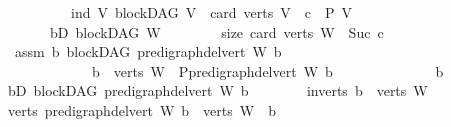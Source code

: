 \begin{isabellebody}
\ \ \isamarkupfalse%
\ {\isacharminus}{\kern0pt}\isanewline
\ \ \ \ \isamarkupfalse%
\ ind{\isacharcolon}{\kern0pt}\ {\isachardoublequoteopen}{\isasymAnd}V{\isachardot}{\kern0pt}\ {\isacharparenleft}{\kern0pt}blockDAG\ V\ {\isasymLongrightarrow}\ card\ {\isacharparenleft}{\kern0pt}verts\ V{\isacharparenright}{\kern0pt}\ {\isacharequal}{\kern0pt}\ c\ {\isasymLongrightarrow}\ P\ V{\isacharparenright}{\kern0pt}{\isachardoublequoteclose}\isanewline
\ \ \ \ \ \ \ bD{\isacharcolon}{\kern0pt}\ {\isachardoublequoteopen}blockDAG\ W{\isachardoublequoteclose}\isanewline
\ \ \ \ \ \ \ \ size{\isacharcolon}{\kern0pt}\ {\isachardoublequoteopen}card\ {\isacharparenleft}{\kern0pt}verts\ W{\isacharparenright}{\kern0pt}\ {\isacharequal}{\kern0pt}\ Suc\ c{\isachardoublequoteclose}\isanewline
\ \ \ \ \isamarkupfalse%
\ \ assm{}{\isacharcolon}{\kern0pt}\ {\isachardoublequoteopen}{\isasymAnd}b{\isachardot}{\kern0pt}\ blockDAG\ {\isacharparenleft}{\kern0pt}pre{\isacharunderscore}{\kern0pt}digraph{\isachardot}{\kern0pt}del{\isacharunderscore}{\kern0pt}vert\ W\ b{\isacharparenright}{\kern0pt}\ \isanewline
\ \ \ \ \ \ \ \ \ \ \ \ {\isasymLongrightarrow}\ b\ {\isasymin}\ verts\ W\ {\isasymLongrightarrow}\ P{\isacharparenleft}{\kern0pt}pre{\isacharunderscore}{\kern0pt}digraph{\isachardot}{\kern0pt}del{\isacharunderscore}{\kern0pt}vert\ W\ b{\isacharparenright}{\kern0pt}{\isachardoublequoteclose}\isanewline
\ \ \ \ \isamarkupfalse%
\ {\isacharminus}{\kern0pt}\isanewline
\ \ \ \ \ \ \isamarkupfalse%
\ b\isanewline
\ \ \ \ \ \ \isamarkupfalse%
\ bD{}{\isacharcolon}{\kern0pt}\ {\isachardoublequoteopen}blockDAG\ {\isacharparenleft}{\kern0pt}pre{\isacharunderscore}{\kern0pt}digraph{\isachardot}{\kern0pt}del{\isacharunderscore}{\kern0pt}vert\ W\ b{\isacharparenright}{\kern0pt}{\isachardoublequoteclose}\isanewline
\ \ \ \ \ \ \isamarkupfalse%
\ in{\isacharunderscore}{\kern0pt}verts{\isacharcolon}{\kern0pt}\ {\isachardoublequoteopen}b\ {\isasymin}\ verts\ W{\isachardoublequoteclose}\isanewline
\ \ \ \ \ \ \isamarkupfalse%
\ {\isachardoublequoteopen}verts\ {\isacharparenleft}{\kern0pt}pre{\isacharunderscore}{\kern0pt}digraph{\isachardot}{\kern0pt}del{\isacharunderscore}{\kern0pt}vert\ W\ b{\isacharparenright}{\kern0pt}\ {\isacharequal}{\kern0pt}\ verts\ W\ {\isacharminus}{\kern0pt}\ {\isacharbraceleft}{\kern0pt}b{\isacharbraceright}{\kern0pt}{\isachardoublequoteclose}\isanewline
\ \ \ \ \ \ \ \ \isamarkupfalse%

\end{isabellebody}
